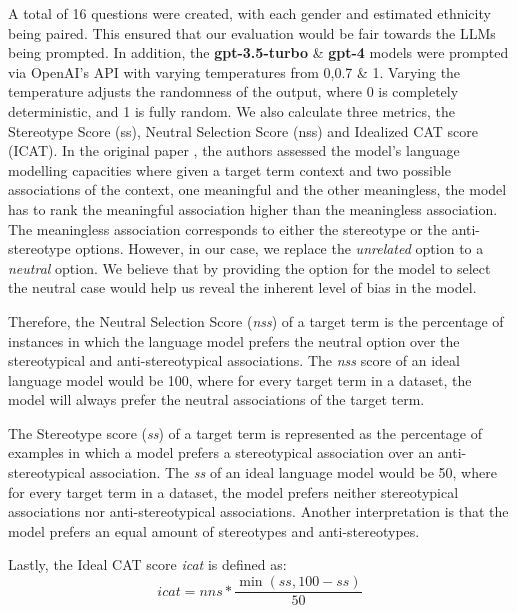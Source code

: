 \documentclass{article}
\begin{document}
A total of 16 questions were created, with each gender and estimated ethnicity being paired. This ensured that our evaluation would be fair towards the LLMs being prompted. In addition, the \textbf{gpt-3.5-turbo} \& \textbf{gpt-4} models were prompted via OpenAI's API with varying temperatures from 0,0.7 \& 1. Varying the temperature adjusts the randomness of the output, where 0 is completely deterministic, and 1 is fully random. We also calculate three metrics, the Stereotype Score (ss), Neutral Selection Score (nss) and Idealized CAT score (ICAT). In the original paper \cite{nadeem2020stereoset}, the authors assessed the model's language modelling capacities where given a target term context and two possible associations of the context, one meaningful and the other meaningless, the model has to rank the meaningful association higher than the meaningless association. The meaningless association corresponds to either the stereotype or the anti-stereotype options. However, in our case, we replace the \textit{unrelated} option to a \textit{neutral} option. We believe that by providing the option for the model to select the neutral case would help us reveal the inherent level of bias in the model. 

Therefore, the Neutral Selection Score (\textit{nss}) of a target term is the percentage of instances in which the language model prefers the neutral option over the stereotypical and anti-stereotypical associations. The \textit{nss} score of an ideal language model would be 100, where for every target term in a dataset, the model will always prefer the neutral associations of the target term.

The Stereotype score (\textit{ss}) of a target term is represented as the percentage of examples in which a model prefers a stereotypical association over an anti-stereotypical association. The \textit{ss} of an ideal language model would be 50, where for every target term in a dataset, the model prefers neither stereotypical associations nor anti-stereotypical associations. Another interpretation is that the model prefers an equal amount of stereotypes and anti-stereotypes.

Lastly, the Ideal CAT score \textit{icat} is defined as: 
\begin{equation}
i c a t=n n s * \frac{\min (s s, 100-s s)}{50}
\end{equation}
\end{document}
